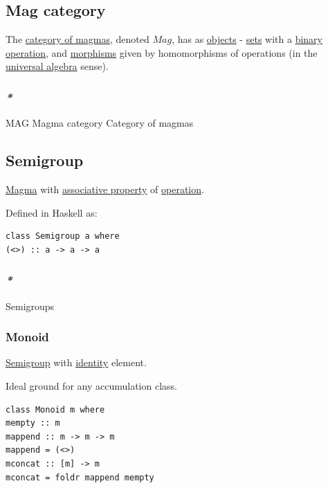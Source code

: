 \documentclass[a4paper,14pt,oneside]{book}
\begin{document}
\subsection{\label{org265f06b}Mag category}
\label{sec:org73f8f73}
The \hyperref[orgb9c4ebf]{category of magmas}, denoted \(Mag\), has as \hyperref[org07ba60b]{objects} - \hyperref[orgd8e5c85]{sets} with a \hyperref[org7cc4f14]{binary} \hyperref[org0f0efbc]{operation}, and \hyperref[org81cc7d1]{morphisms} given by homomorphisms of operations (in the \hyperref[orgee9981e]{universal algebra} sense).

\subsubsection{\emph{*}}
\label{sec:org76237e3}

\label{orgafab163}MAG
\label{orgebe780d}Magma category
\label{orgb9c4ebf}Category of magmas

\subsection{\label{org8c6ee85}Semigroup}
\label{sec:orga657ab2}
\hyperref[org07dd06f]{Magma} with \hyperref[org457631d]{associative property} of \hyperref[org0f0efbc]{operation}.

Defined in Haskell as:
\begin{verbatim}
class Semigroup a where
(<>) :: a -> a -> a
\end{verbatim}

\subsubsection{\emph{*}}
\label{sec:org04de4b4}

\label{orgd31a9cf}Semigroups

\subsubsection{\label{org2993534}Monoid}
\label{sec:org2938d0a}
\hyperref[org8c6ee85]{Semigroup} with \hyperref[org931538d]{identity} element.

Ideal ground for any accumulation class.

\begin{verbatim}
class Monoid m where
mempty :: m
mappend :: m -> m -> m
mappend = (<>)
mconcat :: [m] -> m
mconcat = foldr mappend mempty
\end{verbatim}
\end{document}
